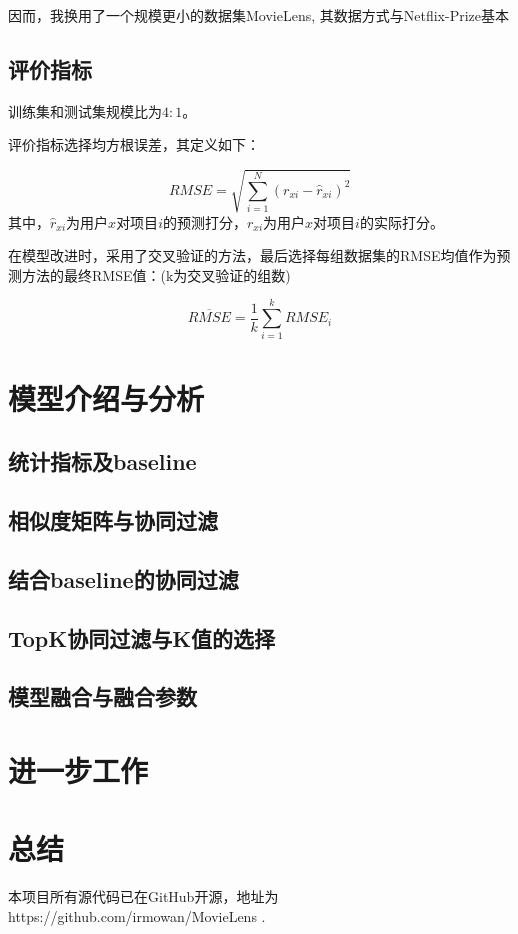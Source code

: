 \documentclass[a4paper,12pt]{ctexart}
\begin{document}
\begin{spacing}{1.35}
因而，我换用了一个规模更小的数据集MovieLens, 其数据方式与Netflix-Prize基本

\subsection{评价指标}

训练集和测试集规模比为$4:1$。

评价指标选择均方根误差，其定义如下：

\[RMSE = \sqrt{\sum_{i = 1}^{N}(r_{xi} - \hat{r}_{xi})^{2}}\]
其中，$\hat{r}_{xi}$为用户$x$对项目$i$的预测打分，$r_{xi}$为用户$x$对项目$i$的实际打分。

在模型改进时，采用了交叉验证的方法，最后选择每组数据集的RMSE均值作为预测方法的最终RMSE值：(k为交叉验证的组数)

\[\overline{RMSE} = \frac{1}{k}\sum_{i=1}^{k}RMSE_{i}\]

\section{模型介绍与分析}

\subsection{统计指标及baseline}

\subsection{相似度矩阵与协同过滤}

\subsection{结合baseline的协同过滤}

\subsection{TopK协同过滤与K值的选择}

\subsection{模型融合与融合参数}

\section{进一步工作}

\section{总结}

本项目所有源代码已在GitHub开源，地址为{https://github.com/irmowan/MovieLens} .

\renewcommand\refname{参考文献}



\end{spacing}
\end{document}
